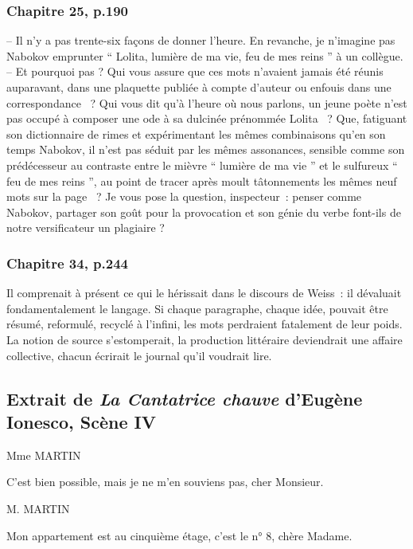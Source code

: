 \documentclass{article}
\begin{document}
			\subsubsection{Chapitre 25, p.190}\label{ada_bibli_babel}
				-- Il	 n'y	 a	 pas	 trente-six	 façons	 de	 donner	 l'heure.	 En	 revanche,	 je
				n'imagine	pas	Nabokov	emprunter	``	Lolita,	lumière	de	ma	vie,	feu	de	mes
				reins	''	à	un	collègue.\\
				-- Et	pourquoi	pas	?	Qui	vous	assure	que	ces	mots	n'avaient	jamais	été
				réunis	 auparavant,	 dans	 une	 plaquette	 publiée	 à	 compte	 d'auteur	 ou enfouis	 dans	 une	 correspondance	~?	 Qui	 vous	 dit	 qu'à	 l'heure	 où	 nous
				parlons,	un	jeune	poète	n'est	pas	occupé	à	composer	une	ode	à	sa	dulcinée
				prénommée	 Lolita	~?	 Que,	 fatiguant	 son	 dictionnaire	 de	 rimes	 et
				expérimentant	les	mêmes	combinaisons	qu'en	son	temps	Nabokov,	il	n'est
				pas	séduit	par	les	mêmes	assonances,	sensible	comme	son	prédécesseur	au
				contraste	entre	le	mièvre	``	lumière	de	ma	vie	''	et	le	sulfureux	``	feu	de	mes
				reins	'',	au	point	de	tracer	après	moult	tâtonnements	les	mêmes	neuf	mots
				sur	 la	 page	~?	 Je	 vous	 pose	 la	 question,	 inspecteur~:	 penser	 comme
				Nabokov,	 partager	 son	 goût	 pour	 la	 provocation	 et	 son	 génie	 du	 verbe
				font-ils	de	notre	versificateur	un	plagiaire	?
			
			\subsubsection{Chapitre 34, p.244}\label{ada_valeur_langage}
				Il	comprenait	à	présent	ce	qui	le	hérissait	dans	le	discours	de	Weiss~:	il
				dévaluait	 fondamentalement	 le	 langage.	 Si	 chaque	 paragraphe,	 chaque
				idée,	pouvait	être	résumé,	reformulé,	recyclé	à	l'infini,	les	mots	perdraient
				fatalement	de	leur	poids.	La	notion	de	source	s'estomperait,	la	production
				littéraire	deviendrait	une	affaire	collective,	chacun	écrirait	le	journal	qu'il
				voudrait	lire.
		\subsection{Extrait de \textit{La Cantatrice chauve} d'Eugène Ionesco, Scène IV} \label{cantatrice}
			\begin{center}
				Mme MARTIN
			\end{center}
			C'est bien possible, mais je ne m'en souviens pas,
			cher Monsieur.
			
			\begin{center}
				M. MARTIN
			\end{center}
			Mon appartement est au cinquième étage, c'est le n° 8, chère Madame.
			
\end{document}
